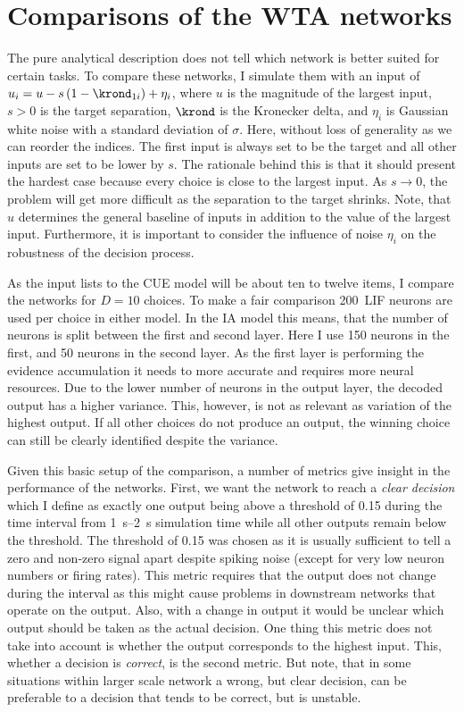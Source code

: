\section{Comparisons of the WTA networks}
The pure analytical description does not tell which network is better suited for certain tasks.
To compare these networks, I simulate them with an input of $u_i = u - s\del{1 - \krond_{1i}} + \eta_i$, where $u$ is the magnitude of the largest input, $s > 0$ is the target separation, $\krond$ is the Kronecker delta, and $\eta_i$ is Gaussian white noise with a standard deviation of $\sigma$.
Here, without loss of generality as we can reorder the indices.
The first input is always set to be the target and all other inputs are set to be lower by $s$.
The rationale behind this is that it should present the hardest case because every choice is close to the largest input.
As $s \rightarrow 0$, the problem will get more difficult as the separation to the target shrinks.
Note, that $u$ determines the general baseline of inputs in addition to the value of the largest input.
Furthermore, it is important to consider the influence of noise $\eta_i$ on the robustness of the decision process.

As the input lists to the CUE model will be about ten to twelve items, I compare the networks for $D=10$ choices.
To make a fair comparison \num{200}~LIF neurons are used per choice in either model.
In the IA model this means, that the number of neurons is split between the first and second layer.
Here I use \num{150} neurons in the first, and \num{50} neurons in the second layer.
As the first layer is performing the evidence accumulation it needs to more accurate and requires more neural resources.
Due to the lower number of neurons in the output layer, the decoded output has a higher variance.
This, however, is not as relevant as variation of the highest output.
If all other choices do not produce an output, the winning choice can still be clearly identified despite the variance.

Given this basic setup of the comparison, a number of metrics give insight in the performance of the networks.
First, we want the network to reach a \emph{clear decision} which I define as exactly one output being above a threshold of \num{0.15} during the time interval from \SIrange{1}{2}{\second} simulation time while all other outputs remain below the threshold.
The threshold of \num{0.15} was chosen as it is usually sufficient to tell a zero and non-zero signal apart despite spiking noise (except for very low neuron numbers or firing rates).
This metric requires that the output does not change during the interval as this might cause problems in downstream networks that operate on the output.
Also, with a change in output it would be unclear which output should be taken as the actual decision.
One thing this metric does not take into account is whether the output corresponds to the highest input.
This, whether a decision is \emph{correct}, is the second metric.
But note, that in some situations within larger scale network a wrong, but clear decision, can be preferable to a decision that tends to be correct, but is unstable.

